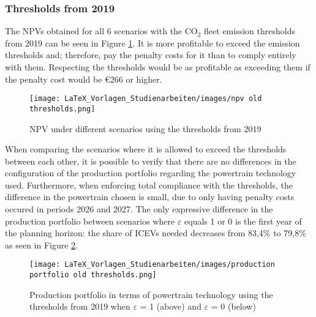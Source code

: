 \subsubsection{Thresholds from 2019}\label{resultexperiment2old}
The \gls{NPV}s obtained for all 6 scenarios with the $\text{CO}_{2}$ fleet emission thresholds from 2019 can be seen in Figure \ref{fig:NPV for Old Thresholds}. It is more profitable to exceed the emission thresholds and; therefore, pay the penalty costs for it than to comply entirely with them. Respecting the thresholds would be as profitable as exceeding them if the penalty cost would be \euro{266} or higher. \\
\begin{figure}[H]
\begin{center}
\texttt{[image: LaTeX\_Vorlagen\_Studienarbeiten/images/npv old thresholds.png]}
\caption{\gls{NPV} under different scenarios using the thresholds from 2019}
\label{fig:NPV for Old Thresholds}
\end{center}
\end{figure}
When comparing the scenarios where it is allowed to exceed the thresholds between each other, it is possible to verify that there are no differences in the configuration of the production portfolio regarding the powertrain technology used. Furthermore, when enforcing total compliance with the thresholds, the difference in the powertrain chosen is small, due to only having penalty costs occured in periods 2026 and 2027. The only expressive difference in the production portfolio between scenarios where $\varepsilon$ equals 1 or 0 is the first year of the planning horizon: the share of \gls{ICEV}s needed decreases from 83,4\% to 79,8\% as seen in Figure \ref{fig:portfolio for old thresholds}.
\begin{figure}[h]
\begin{center}
\texttt{[image: LaTeX\_Vorlagen\_Studienarbeiten/images/production portfolio old thresholds.png]}
\caption{Production portfolio in terms of powertrain technology using the thresholds from 2019 when $\varepsilon$ = 1 (above) and $\varepsilon$ = 0 (below)}
\label{fig:portfolio for old thresholds}
\end{center}
\end{figure}


